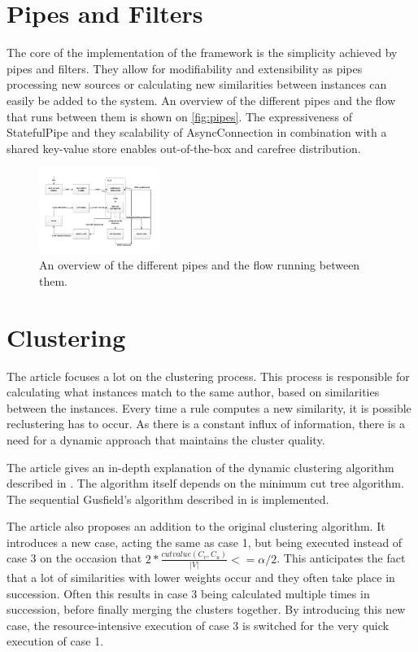 \documentclass[9pt, twocolumn]{phdsymp} %
\begin{document}
\section{Pipes and Filters}
\label{pipes}

The core of the implementation of the framework is the simplicity achieved by pipes and filters. They allow for modifiability and extensibility as pipes processing new sources or calculating new similarities between instances can easily be added to the system. An overview of the different pipes and the flow that runs between them is shown on \autoref{fig:pipes}. The expressiveness of StatefulPipe and they scalability of AsyncConnection in combination with a shared key-value store enables out-of-the-box and carefree distribution.

\begin{figure}[hb!]
	\centering
	\includegraphics[width= 0.35\textwidth]{fig/completepipesmall.pdf}
	\caption{An overview of the different pipes and the flow running between them.}
	\label{fig:pipes}
\end{figure}

\section{Clustering}

The article focuses a lot on the clustering process. This process is responsible for calculating what instances match to the same author, based on similarities between the instances. Every time a rule computes a new similarity, it is possible reclustering has to occur. As there is a constant influx of information, there is a need for a dynamic approach that maintains the cluster quality. 

The article gives an in-depth explanation of the dynamic clustering algorithm described in \cite{dyncluster}. The algorithm itself depends on the minimum cut tree algorithm. The sequential Gusfield's algorithm described in \cite{gusfield} is implemented. 

The article also proposes an addition to the original clustering algorithm. It introduces a new case, acting the same as case 1, but being executed instead of case 3 on the occasion that $2 * \frac{cutvalue(C_v, C_u)}{\left|V\right|} <= \alpha / 2$. This anticipates the fact that a lot of similarities with lower weights occur and they often take place in succession. Often this results in case 3 being calculated multiple times in succession, before finally merging the clusters together. By introducing this new case, the resource-intensive execution of case 3 is switched for the very quick execution of case 1.
\end{document}
